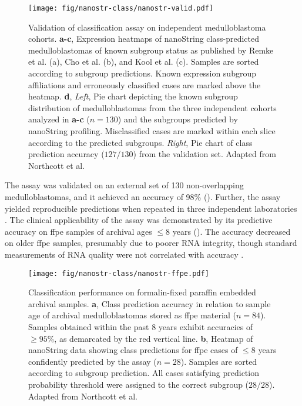 \begin{figure}[hb]
	\begin{center}
		\texttt{[image: fig/nanostr-class/nanostr-valid.pdf]}
	\end{center}
	\caption[Validation of classification assay on independent medulloblastoma cohorts]
	{
	Validation of classification assay on independent medulloblastoma cohorts.
	\textbf{a-c}, Expression heatmaps of nanoString class-predicted medulloblastomas of known subgroup status as published by Remke et al. (a), Cho et al. (b), and Kool et al. (c). Samples are sorted according to subgroup predictions. Known expression subgroup affiliations and erroneously classified cases are marked above the heatmap.
	\textbf{d}, \emph{Left}, Pie chart depicting the known subgroup distribution of medulloblastomas from the three independent cohorts analyzed in \textbf{a-c} ($n = 130$) and the subgroups predicted by nanoString profiling. Misclassified cases are marked within each slice according to the predicted subgroups. \emph{Right}, Pie chart of class prediction accuracy ($127/130$) from the validation set. Adapted from Northcott et al.
	}
	\label{fig:nanostr-valid}
\end{figure}

\clearpage

The assay was validated on an external set of 130 non-overlapping medulloblastomas, and it achieved an accuracy of 98\% (). Further, the assay yielded reproducible predictions when repeated in three independent laboratories . The clinical applicability of the assay was demonstrated by its predictive accuracy on \gls{ffpe} samples of archival ages $\leq 8$ years (). The accuracy decreased on older \gls{ffpe} samples, presumably due to poorer RNA integrity, though standard measurements of RNA quality were not correlated with accuracy .

\begin{figure}[ht]
	\begin{center}
		\texttt{[image: fig/nanostr-class/nanostr-ffpe.pdf]}
	\end{center}
	\caption[Classification performance on formalin-fixed paraffin embedded archival samples]
	{
	Classification performance on formalin-fixed paraffin embedded archival samples.
	\textbf{a}, Class prediction accuracy in relation to sample age of archival medulloblastomas stored as \gls{ffpe} material ($n = 84$). Samples obtained within the past 8 years exhibit accuracies of $\geq 95\%$, as demarcated by the red vertical line.
	\textbf{b}, Heatmap of nanoString data showing class predictions for \gls{ffpe} cases of $\leq 8$ years confidently predicted by the assay ($n = 28$). Samples are sorted according to subgroup prediction. All cases satisfying prediction probability threshold were assigned to the correct subgroup ($28/28$). Adapted from Northcott et al.
	}
	\label{fig:nanostr-ffpe}
\end{figure}


